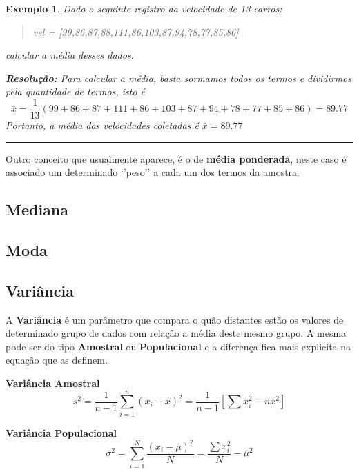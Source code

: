 \documentclass[
]{book}
\newtheorem{example}{Exemplo}
\begin{document}
\begin{example}
Dado o seguinte registro da velocidade de 13 carros:

\begin{quote}
vel = {[}99,86,87,88,111,86,103,87,94,78,77,85,86{]}
\end{quote}

calcular a média desses dados.

\textbf{Resolução:} Para calcular a média, basta sormamos todos os termos e dividirmos pela quantidade de termos, isto é
\[
\bar{x} = \frac{1}{13}(99+86+87+111+86+103+87+94+78+77+85+86) = 89.77
\]
Portanto, a média das velocidades coletadas é \(\bar{x} = 89.77\)
\end{example}

\begin{center}\rule{0.5\linewidth}{0.5pt}\end{center}

Outro conceito que usualmente aparece, é o de \textbf{média ponderada}, neste caso é associado um determinado `'peso'' a cada um dos termos da amostra.

\hypertarget{mediana}{%
\subsection{Mediana}\label{mediana}}

\hypertarget{moda}{%
\subsection{Moda}\label{moda}}

\hypertarget{variuxe2ncia}{%
\subsection{Variância}\label{variuxe2ncia}}

A \textbf{Variância} é um parâmetro que compara o quão distantes estão os valores de determinado grupo de dados com relação a média deste mesmo grupo. A mesma pode ser do tipo \textbf{Amostral} ou \textbf{Populacional} e a diferença fica mais explicita na equação que as definem.

\textbf{Variância Amostral}
\begin{equation}
s^2 =  \frac{1}{n-1}\sum_{i=1}^n(x_i - \bar{x})^2 = \frac{1}{n-1}\left[\sum x_i^2 - n \bar{x}^2 \right]
\end{equation}

\textbf{Variância Populacional}
\begin{equation}
\sigma^2 = \sum_{i=1}^N \frac{(x_i - \bar{\mu})^2}{N} = \frac{\sum x_i^2}{N} - \bar{\mu}^2  
\end{equation}
\end{document}
